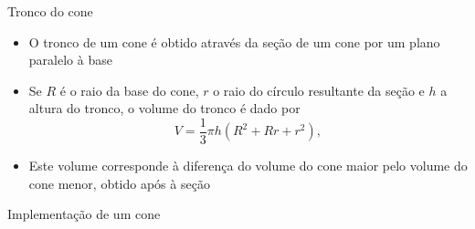 \begin{frame}[fragile]{Tronco do cone}

    \begin{itemize}
        \item O tronco de um cone é obtido através da seção de um cone por um plano paralelo à base
        \pause

        \item Se $R$ é o raio da base do cone, $r$ o raio do círculo resultante da seção e $h$ a 
            altura do tronco, o volume do tronco é dado por
        \[
            V = \frac{1}{3}\pi h(R^2 + Rr + r^2),
        \]
        \pause

        \item Este volume corresponde à diferença do volume do cone maior pelo volume do cone menor,
            obtido após à seção
        \pause

    \end{itemize}

    \begin{figure}
        \centering
    \end{figure}

\end{frame}

\begin{frame}[fragile]{Implementação de um cone}
\end{frame}

